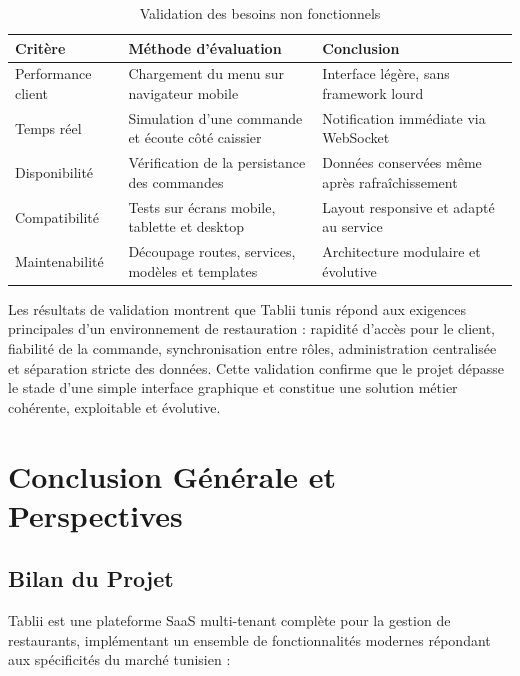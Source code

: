 \documentclass[12pt,a4paper]{report}
\begin{document}
\begin{table}[H]
    \centering
    \begin{tabularx}{\textwidth}{l X X}
        \toprule
        \rowcolor{orange!10}
        \textbf{Critère} & \textbf{Méthode d'évaluation} & \textbf{Conclusion} \\
        \midrule
        Performance client & Chargement du menu sur navigateur mobile & Interface légère, sans framework lourd \\
        Temps réel & Simulation d'une commande et écoute côté caissier & Notification immédiate via WebSocket \\
        Disponibilité & Vérification de la persistance des commandes & Données conservées même après rafraîchissement \\
        Compatibilité & Tests sur écrans mobile, tablette et desktop & Layout responsive et adapté au service \\
        Maintenabilité & Découpage routes, services, modèles et templates & Architecture modulaire et évolutive \\
        \bottomrule
    \end{tabularx}
    \caption{Validation des besoins non fonctionnels}
    \label{tab:non-functional-validation}
\end{table}

Les résultats de validation montrent que Tablii tunis répond aux exigences principales d'un environnement de restauration : rapidité d'accès pour le client, fiabilité de la commande, synchronisation entre rôles, administration centralisée et séparation stricte des données. Cette validation confirme que le projet dépasse le stade d'une simple interface graphique et constitue une solution métier cohérente, exploitable et évolutive.

\cleardoublepage
\chapter*{Conclusion Générale et Perspectives}

\section*{Bilan du Projet}

Tablii est une plateforme SaaS multi-tenant complète pour la gestion de restaurants, implémentant un ensemble de fonctionnalités modernes répondant aux spécificités du marché tunisien :
\end{document}
